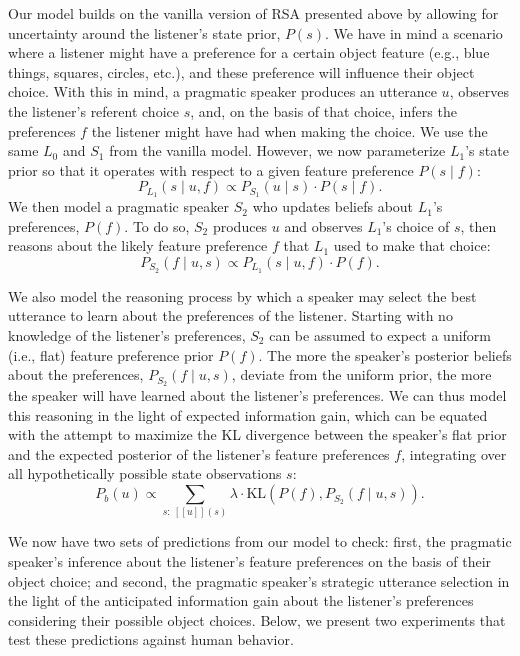 \documentclass[10pt,a4paper]{article}
\newcommand{\gcs}[1]{\textcolor{blue}{[gcs: #1]}}
\begin{document}
Our model builds on the vanilla version of RSA presented above by allowing for uncertainty around the listener's state prior, $P(s)$. %
We have in mind a scenario where a listener might have a preference for a certain object feature (e.g., blue things, squares, circles, etc.), and these preference will influence their object choice. With this in mind, a pragmatic speaker produces an utterance $u$, observes the listener's referent choice $s$, and, on the basis of that choice, infers the preferences $f$ the listener might have had when making the choice.
We use the same $L_0$ and $S_1$ from the vanilla model. However, we now parameterize $L_1$'s state prior so that it operates with respect to a given feature preference $P(s\mid f)$:
$$P_{L_{1}}(s\mid u,f) \propto P_{S_{1}}(u\mid s) \cdot P(s\mid f).$$
We then model a pragmatic speaker $S_2$ who updates beliefs about $L_1$'s preferences, $P(f)$. To do so, $S_2$ produces $u$ and observes $L_1$'s choice of $s$, then reasons about the likely feature preference $f$ that $L_1$ used to make that choice:
$$P_{S_{2}}(f\mid u,s) \propto P_{L_{1}}(s\mid u,f) \cdot P(f).$$

We also model the reasoning process by which a speaker may select the best utterance to learn about the preferences of the listener.
Starting with no knowledge of the listener's preferences, $S_2$ can be assumed to expect a uniform (i.e., flat) feature preference prior $P(f)$. The more the speaker's posterior beliefs about the preferences, $P_{S_{2}}(f\mid u,s)$, deviate from the uniform prior, the more the speaker will have learned about the listener's preferences. 
We can thus model this reasoning in the light of expected information gain, which can be equated with the attempt to maximize the KL divergence between the speaker's flat prior and the expected posterior of the listener's feature preferences $f$, integrating over all hypothetically possible state observations $s$: %
$$P_{b}(u) \propto \sum_{s:\  [\![u]\!](s)}\lambda \cdot \textrm{KL}(P(f),P_{S_{2}}(f\mid u,s)).$$

We now have two sets of predictions from our model to check: first, the pragmatic speaker's inference about the listener's feature preferences on the basis of their object choice; and second, the pragmatic speaker's strategic utterance selection in the light of the anticipated information gain about the listener's preferences considering their possible object choices. Below, we present two experiments that test these predictions against human behavior.
\end{document}
